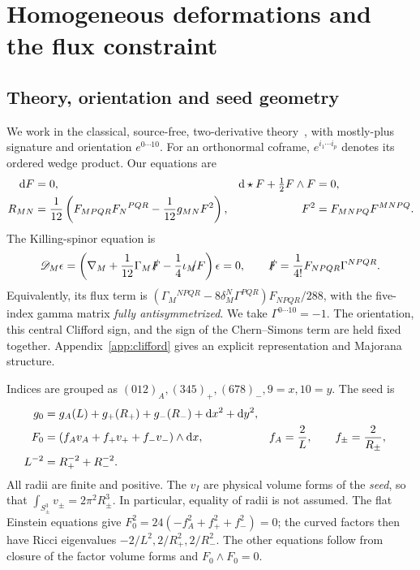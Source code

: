 \section{Homogeneous deformations and the flux constraint}\label{sec:geometry}
\subsection{Theory, orientation and seed geometry}
We work in the classical, source-free, two-derivative theory~\cite{CremmerJuliaScherk1978}, with mostly-plus signature and orientation $e^{0\cdots10}$. For an orthonormal coframe, $e^{i_1\cdots i_p}$ denotes its ordered wedge product. Our equations are
\begin{align}
\mathrm{d} F&=0,& \mathrm{d}\star F+\tfrac12F\wedge F&=0,\notag\\
R_{MN}&=\frac1{12}\left(F_{MPQR}F_N{}^{PQR}-\frac1{12}g_{MN}F^2\right),&
F^2&=F_{MNPQ}F^{MNPQ}.\label{eq:eom}
\end{align}
The Killing-spinor equation is
\begin{equation}
\mathscr D_M\epsilon=\left(\nabla_M+\frac1{12}\Gamma_M\slashed F
-\frac14\slashed{\iota_M F}\right)\epsilon=0,
\qquad \slashed F=\frac1{4!}F_{NPQR}\Gamma^{NPQR}.
\label{eq:kse}
\end{equation}
Equivalently, its flux term is $(\Gamma_M{}^{NPQR}-8\delta_M^N\Gamma^{PQR})F_{NPQR}/288$, with the five-index gamma matrix \emph{fully antisymmetrized}. We take $\Gamma^{0\cdots10}=-1$. The orientation, this central Clifford sign, and the sign of the Chern--Simons term are held fixed together. Appendix~\ref{app:clifford} gives an explicit representation and Majorana structure.

Indices are grouped as $(012)_A,(345)_+,(678)_-,9=x,10=y$. The seed is
\begin{align}
g_0&=g_A(L)+g_+(R_+)+g_-(R_-)+\mathrm{d} x^2+\mathrm{d} y^2,\notag\\
F_0&=(f_Av_A+f_+v_++f_-v_-)\wedge\mathrm{d} x,
& f_A&=\frac2L,\qquad f_\pm=\frac2{R_\pm},\label{eq:seed}\\
L^{-2}&=R_+^{-2}+R_-^{-2}.\label{eq:radii}
\end{align}
All radii are finite and positive. The $v_I$ are physical volume forms of the \emph{seed}, so that $\int_{S^3_\pm}v_\pm=2\pi^2R_\pm^3$. In particular, equality of radii is not assumed. The flat Einstein equations give $F_0^2=24(-f_A^2+f_+^2+f_-^2)=0$; the curved factors then have Ricci eigenvalues $-2/L^2,2/R_+^2,2/R_-^2$. The other equations follow from closure of the factor volume forms and $F_0\wedge F_0=0$.

